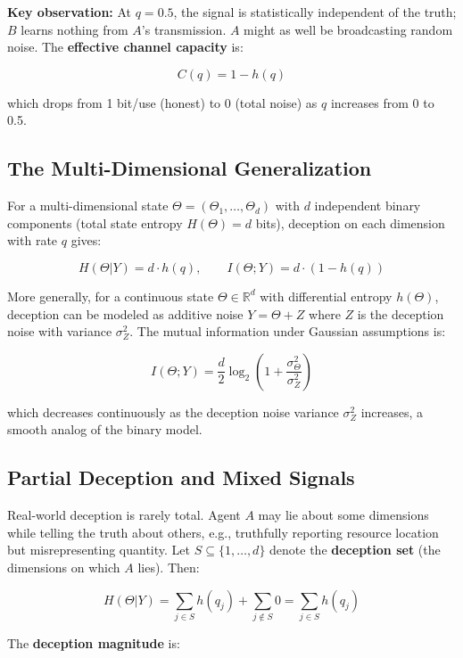 \documentclass[11pt]{article}
\theoremstyle{plain}
\theoremstyle{definition}
\theoremstyle{remark}
\let\origsubsection\subsection
\renewcommand{\subsection}{\needspace{7\baselineskip}\origsubsection}
\begin{document}
\textbf{Key observation:} At \(q = 0.5\), the signal is statistically
independent of the truth; \(B\) learns nothing from \(A\)'s
transmission. \(A\) might as well be broadcasting random noise. The
\textbf{effective channel capacity} is:

\[C(q) = 1 - h(q)\]

which drops from 1 bit/use (honest) to 0 (total noise) as \(q\)
increases from 0 to 0.5.

\subsection{The Multi-Dimensional
Generalization}\label{the-multi-dimensional-generalization}

For a multi-dimensional state \(\Theta = (\Theta_1, \ldots, \Theta_d)\)
with \(d\) independent binary components (total state entropy
\(H(\Theta) = d\) bits), deception on each dimension with rate \(q\)
gives:

\[H(\Theta | Y) = d \cdot h(q), \qquad I(\Theta; Y) = d \cdot (1 - h(q))\]

More generally, for a continuous state \(\Theta \in \mathbb{R}^d\) with
differential entropy \(h(\Theta)\), deception can be modeled as additive
noise \(Y = \Theta + Z\) where \(Z\) is the deception noise with
variance \(\sigma_Z^2\). The mutual information under Gaussian
assumptions is:

\[I(\Theta; Y) = \frac{d}{2} \log_2\left(1 + \frac{\sigma_\Theta^2}{\sigma_Z^2}\right)\]

which decreases continuously as the deception noise variance
\(\sigma_Z^2\) increases, a smooth analog of the binary model.

\subsection{Partial Deception and Mixed
Signals}\label{partial-deception-and-mixed-signals}

Real-world deception is rarely total. Agent \(A\) may lie about some
dimensions while telling the truth about others, e.g., truthfully
reporting resource location but misrepresenting quantity. Let
\(S \subseteq \{1, \ldots, d\}\) denote the \textbf{deception set} (the
dimensions on which \(A\) lies). Then:

\[H(\Theta | Y) = \sum_{j \in S} h(q_j) + \sum_{j \notin S} 0 = \sum_{j \in S} h(q_j)\]

The \textbf{deception magnitude} is:
\end{document}

